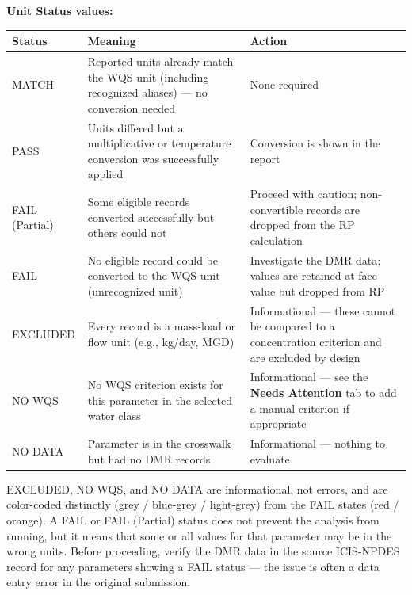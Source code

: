 \documentclass[
  11pt,
  letterpaper,
  DIV=11,
  numbers=noendperiod]{scrartcl}
\newcounter{none} %
\begin{document}
\textbf{Unit Status values:}

{\def\LTcaptype{none} %
\begin{longtable}[]{@{}
  >{\raggedright\arraybackslash}p{}
  >{\raggedright\arraybackslash}p{}
  >{\raggedright\arraybackslash}p{}@{}}
\toprule\noalign{}
\begin{minipage}[b]{\linewidth}\raggedright
Status
\end{minipage} & \begin{minipage}[b]{\linewidth}\raggedright
Meaning
\end{minipage} & \begin{minipage}[b]{\linewidth}\raggedright
Action
\end{minipage} \\
\midrule\noalign{}
\endhead
\bottomrule\noalign{}
\endlastfoot
MATCH & Reported units already match the WQS unit (including recognized
aliases) --- no conversion needed & None required \\
PASS & Units differed but a multiplicative or temperature conversion was
successfully applied & Conversion is shown in the report \\
FAIL (Partial) & Some eligible records converted successfully but others
could not & Proceed with caution; non-convertible records are dropped
from the RP calculation \\
FAIL & No eligible record could be converted to the WQS unit
(unrecognized unit) & Investigate the DMR data; values are retained at
face value but dropped from RP \\
EXCLUDED & Every record is a mass-load or flow unit (e.g., kg/day, MGD)
& Informational --- these cannot be compared to a concentration
criterion and are excluded by design \\
NO WQS & No WQS criterion exists for this parameter in the selected
water class & Informational --- see the \textbf{Needs Attention} tab to
add a manual criterion if appropriate \\
NO DATA & Parameter is in the crosswalk but had no DMR records &
Informational --- nothing to evaluate \\
\end{longtable}
}

EXCLUDED, NO WQS, and NO DATA are informational, not errors, and are
color-coded distinctly (grey / blue-grey / light-grey) from the FAIL
states (red / orange). A FAIL or FAIL (Partial) status does not prevent
the analysis from running, but it means that some or all values for that
parameter may be in the wrong units. Before proceeding, verify the DMR
data in the source ICIS-NPDES record for any parameters showing a FAIL
status --- the issue is often a data entry error in the original
submission.
\end{document}
